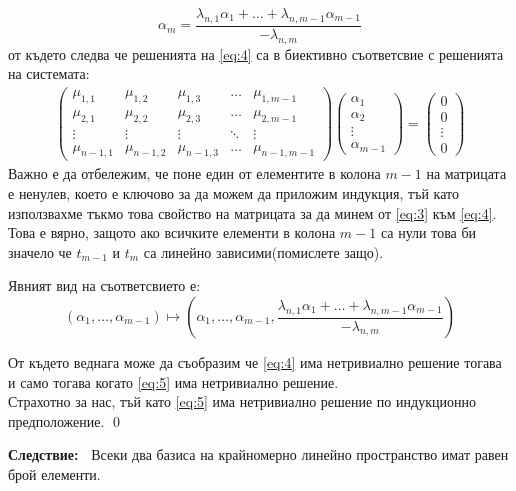 \documentclass[a4paper,12pt,fleqn]{article}
\begin{document}
{      \begin{equation*}
        \alpha_{m}=\frac{\lambda_{n,1}\alpha_{1}+\dots+\lambda_{n,m-1}\alpha_{m-1}}{-\lambda_{n,m}}
      \end{equation*}
      от където следва че решенията на \eqref{eq:4} са в биективно съответсвие с решенията на системата:
      \begin{gather} \label{eq:5}
        \begin{pmatrix}
          \mu_{1, 1} & \mu_{1, 2} & \mu_{1, 3} & \dots & \mu_{1,m-1} \\
          \mu_{2, 1} & \mu_{2, 2} & \mu_{2, 3} & \dots & \mu_{2,m-1} \\
          \vdots & \vdots & \vdots & \ddots & \vdots \\
          \mu_{n-1, 1} & \mu_{n-1, 2} & \mu_{n-1, 3} & \dots & \mu_{n-1,m-1}
        \end{pmatrix}
        \begin{pmatrix}
          \alpha_{1} \\
          \alpha_{2} \\
          \vdots \\
          \alpha_{m-1}
        \end{pmatrix}
        =
        \begin{pmatrix}
          0 \\
          0 \\
          \vdots \\
          0
        \end{pmatrix}
      \end{gather} 
      Важно е да отбележим, че поне един от елементите в колона \( m-1 \) на матрицата е ненулев, което е ключово за да можем да приложим индукция, тъй като използвахме тъкмо това свойство на матрицата за да минем от \eqref{eq:3} към \eqref{eq:4}. Това е вярно, защото ако всичките елементи в колона \( m-1 \) са нули това би значело че \( t_{m-1} \) и \( t_{m} \) са линейно зависими(помислете защо).

      Явният вид на съответсвието е:
      \begin{equation*}
        \left( \alpha_{1},\dots,\alpha_{m-1} \right) \longmapsto \left( \alpha_{1},\dots,\alpha_{m-1}, \frac{\lambda_{n,1}\alpha_{1}+\dots+\lambda_{n,m-1}\alpha_{m-1}}{-\lambda_{n,m}}\right)
      \end{equation*}

      От където веднага може да съобразим че \eqref{eq:4} има нетривиално решение тогава и само тогава когато \eqref{eq:5} има нетривиално решение. \\
      Страхотно за нас, тъй като \eqref{eq:5} има нетривиално решение по индукционно предположение.
      \qed
    }

    \textbf{Следствие:~} Всеки два базиса на крайномерно линейно пространство имат равен брой елементи.



    
\end{document}

